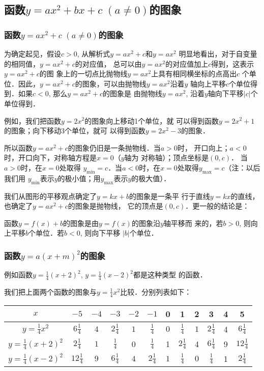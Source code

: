 \subsection{函数$y=ax^2+bx+c\; (a\ne 0)$的图象}
\subsubsection{函数$y=ax^2+c\; (a\ne 0)$的图象}
为确定起见，假设$c>0$, 从解析式$y=ax^2+c$和$y=ax^2$
明显地看出，对于自变量的相同值，$y=ax^2+c$的对应值，
总可以由$y=ax^2$的对应值加上$c$得到，这表示$y=ax^2+c$的图
象上的一切点比抛物线$y=ax^2$上具有相同横坐标的点高出$c$
个单位．因此，$y=ax^2+c$的图象，可以由抛物线$y=ax^2$沿着$y$
轴向上平移$c$个单位得到．如果$c<0$, 那么$y=ax^2+c$的图象是
由抛物线$y=ax^2$, 沿着$y$轴向下平移$|c|$个单位得到．

例如，我们把函数$y=2x^2$的图象向上移动1个单位，就
可以得到函数$y=2x^2+1$的图象；向下移动3个单位，就可
以得到函数$y=2x^2-3$的图象．

所以函数$y=ax^2+c$的图象仍旧是一条抛物线．当$a>0$时，
开口向上；$a<0$时，开口向下，对称轴方程是$x=0$（$y$轴为
对称轴）；顶点坐标是$(0,c)$． 当$a>0$时，在$x=0$处取得
$y_{\min}=c$．当$a<0$时，在$x=0$处取得$y_{\max}=c$（注：以后我们用
$y_{\min}$表示$y$的极小值；用$y_{\max}$表示$y$的极大值）．

我们从图形的平移观点确定了$y=kx+b$的图象是一条平
行于直线$y=kx$的直线，也确定了$y=ax^2+c$的图象是抛物线，
它的顶点是$(0,c)$．更一般的结论是：

函数$y=f(x)+b$的图象是由$y=f(x)$的图象沿$y$轴平移而
来的，若$b>0$, 则向上平移$b$个单位．若$b<0$, 则向下平移
$|b|$个单位．

\subsubsection{函数$y=a(x+m)^2$的图象}
例如函数$y=\frac{1}{4}(x+2)^2$, $y=\frac{1}{4}(x-2)^2$都是这种类型
的函数．

我们把上面两个函数的图象与$y=\frac{1}{4}x^2$比较．分别列表如下：
\begin{center}
\begin{tabular}{c|ccccccccccc}
\hline
    $x$ & $-5$& $-4$& $-3$& $-2$& $-1$& 0& 1& 2& 3& 4& 5\\
\hline
$y=\tfrac{1}{4}x^2$ &  $6\tfrac{1}{4}$   &  $4$  &  $2\tfrac{1}{4}$  &  $1$  &  $\tfrac{1}{4}$  &  $0$  &  $\tfrac{1}{4}$  &  $1$ & $2\tfrac{1}{4}$ &4&$6\tfrac{1}{4}$\\
$y=\tfrac{1}{4}(x+2)^2$& $2\tfrac{1}{4}$ &  $1$  &  $\tfrac{1}{4}$  & 0& $\tfrac{1}{4}$  & 1& $2\tfrac{1}{4}$ &4 &  $6\tfrac{1}{4}$  & 9& $12\tfrac{1}{4}$\\ 
$y=\tfrac{1}{4}(x-2)^2$& $12\tfrac{1}{4}$ &  $9$  &  $6\tfrac{1}{4}$  &  $4$  &  $2\tfrac{1}{4}$  &  $1$  &  $\tfrac{1}{4}$  &  $0$  &  $\tfrac{1}{4}$   &1 &  $2\tfrac{1}{4}$\\ 
\hline
\end{tabular}
\end{center}


